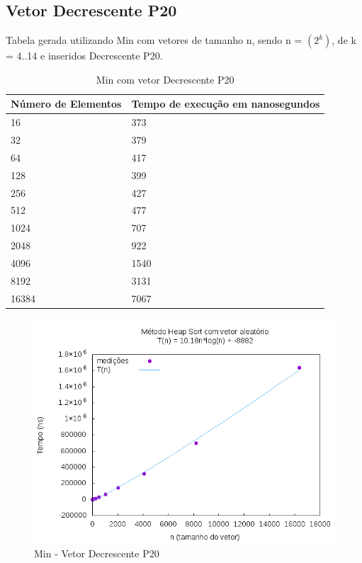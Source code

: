 \documentclass[12pt,a4paper,twoside]{report}
\begin{document}
\subsection{Vetor Decrescente P20}
Tabela gerada utilizando Min com vetores de tamanho n, sendo n = $(2^k)$, de k = 4..14 e inseridos Decrescente P20.
\begin{table}[H]
\centering
\caption{Min com vetor Decrescente P20}
\label{my-label}
\begin{tabular}{|l|l|}
\hline
\multicolumn{1}{|c|}{\textbf{Número de Elementos}} & \multicolumn{1}{c|}{\textbf{Tempo de execução em nanosegundos}} \\ \hline
16 & 373 \\ \hline
32 & 379 \\ \hline
64 & 417 \\ \hline
128 & 399 \\ \hline
256 & 427 \\ \hline
512 & 477 \\ \hline
1024 & 707 \\ \hline
2048 & 922 \\ \hline
4096 & 1540 \\ \hline
8192 & 3131 \\ \hline
16384 & 7067 \\ \hline
\end{tabular}
\end{table}

\begin{figure}[H]
    \centering
    \includegraphics[width=0.7\linewidth]{graficos/HeapSort/vIntAleatorio/vIntAleatorio.png}
  \caption{Min - Vetor Decrescente P20}
\end{figure}
\end{document}
